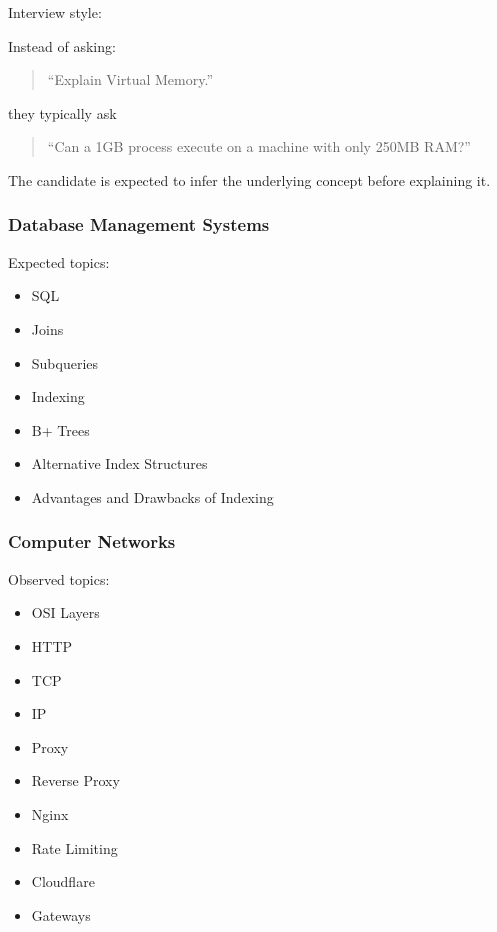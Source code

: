 \documentclass[11pt,a4paper]{article}
\begin{document}
Interview style:

Instead of asking:

\begin{quote}
	``Explain Virtual Memory.''
\end{quote}

they typically ask

\begin{quote}
	``Can a 1GB process execute on a machine with only 250MB RAM?''
\end{quote}

The candidate is expected to infer the underlying concept before explaining it.


\subsubsection{Database Management Systems}

Expected topics:

\begin{itemize}
	\item SQL
	\item Joins
	\item Subqueries
	\item Indexing
	\item B+ Trees
	\item Alternative Index Structures
	\item Advantages and Drawbacks of Indexing
\end{itemize}


\subsubsection{Computer Networks}

Observed topics:

\begin{itemize}
	\item OSI Layers
	\item HTTP
	\item TCP
	\item IP
	\item Proxy
	\item Reverse Proxy
	\item Nginx
	\item Rate Limiting
	\item Cloudflare
	\item Gateways
\end{itemize}
\end{document}
